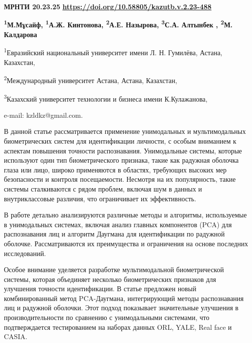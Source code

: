 \newpage
{\bfseries МРНТИ 20.23.25}
\hfill {\bfseries \href{https://doi.org/10.58805/kazutb.v.2.23-488}{https://doi.org/10.58805/kazutb.v.2.23-488}}


\begin{center}
{\bfseries \textsuperscript{1}М.Мұсайф\envelope, \textsuperscript{1}А.Ж. Кинтонова, \textsuperscript{2}А.Е. Назырова, \textsuperscript{3}С.А. Алтынбек , \textsuperscript{2}М. Калдарова}

\textsuperscript{1}Евразийский национальный университет имени Л. Н.
Гумилёва, Астана, Казахстан,

\textsuperscript{2}Международный университет Астана, Астана, Казахстан,

\textsuperscript{3}Казахский университет технологии и бизнеса имени
К.Кулажанова,

e-mail: kzldkz@gmail.com.
\end{center}

В данной статье рассматривается применение унимодальных и
мультимодальных биометрических систем для идентификации личности, с
особым вниманием к аспектам повышения точности распознавания.
Унимодальные системы, которые используют один тип биометрического
признака, такие как радужная оболочка глаза или лицо, широко применяются
в областях, требующих высоких мер безопасности и контроля посещаемости.
Несмотря на их популярность, такие системы сталкиваются с рядом проблем,
включая шум в данных и внутриклассовые различия, что ограничивает их
эффективность.

В работе детально анализируются различные методы и алгоритмы,
используемые в унимодальных системах, включая анализ главных компонентов
(PCA) для распознавания лиц и алгоритм Даугмана для идентификации по
радужной оболочке. Рассматриваются их преимущества и ограничения на
основе последних исследований.

Особое внимание уделяется разработке мультимодальной биометрической
системы, которая объединяет несколько биометрических признаков для
улучшения точности идентификации. В статье предложен новый
комбинированный метод PCA-Даугмана, интегрирующий методы распознавания
лиц и радужной оболочки. Этот подход показывает значительные улучшения в
производительности по сравнению с унимодальными системами, что
подтверждается тестированием на наборах данных ORL, YALE, Real face и
CASIA.

